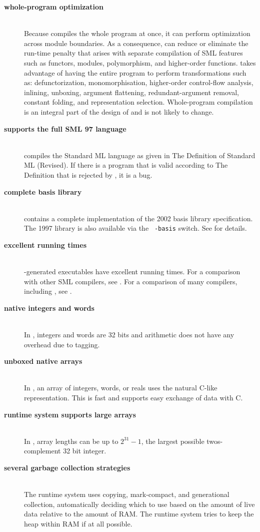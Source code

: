 
\newcommand{\feature}[1]{\item[\bf #1]\hspace{1in}\\}
\begin{description}
\feature{whole-program optimization}
Because {\mlton} compiles the whole program at once, it can perform optimization
across module boundaries.  As a consequence, {\mlton} can reduce or eliminate
the run-time penalty that arises with separate compilation of SML features such
as functors, modules, polymorphism, and higher-order functions.  {\mlton} takes
advantage of having the entire program to perform transformations such as:
defunctorization, monomorphisation, higher-order control-flow analysis,
inlining, unboxing, argument flattening, redundant-argument removal, constant
folding, and representation selection.  Whole-program compilation is an integral
part of the design of {\mlton} and is not likely to change.

\feature{supports the full SML 97 language}
{\mlton} compiles the Standard ML language as given in The Definition
of Standard ML (Revised)\cite{MTHM97}.  If there is a program that is
valid according to The Definition that is rejected by {\mlton}, it is
a bug.

\feature{complete basis library}
{\mlton} contains a complete implementation of the 2002 basis library
specification.  The 1997 library is also available via the {\tt
-basis} switch.  See  for details.

\feature{excellent running times}
{\mlton}-generated executables have excellent running times.
For a comparison with other SML compilers, see
.
For a comparison of many compilers, including {\mlton}, see
.

\feature{native integers and words}
In {\mlton}, integers and words are 32 bits and arithmetic does not have
any overhead due to tagging.

\feature{unboxed native arrays}
In {\mlton}, an array of integers, words, or reals uses the natural C-like
representation.  This is fast and supports easy exchange of data with C.

\feature{runtime system supports large arrays}
In {\mlton}, array lengths can be up to $2^{31} - 1$, the largest possible
twos-complement 32 bit integer.

\feature{several garbage collection strategies}
The {\mlton} runtime system uses copying, mark-compact, and generational
collection, automatically deciding which to use based on the amount of live
data relative to the amount of RAM.  The runtime system tries to keep the heap
within RAM if at all possible.


\end{description}
